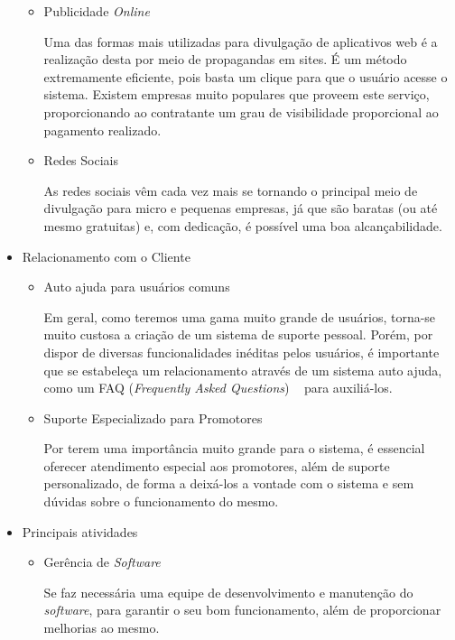 \begin{itemize}
\begin{itemize}
\item Publicidade \textit{Online}

Uma das formas mais utilizadas para divulgação de aplicativos web é a realização desta por meio de propagandas em sites. É um método extremamente eficiente, pois basta um clique para que o usuário acesse o sistema. Existem empresas muito populares que proveem este serviço, proporcionando ao contratante um grau de visibilidade proporcional ao pagamento realizado.

\item Redes Sociais

As redes sociais vêm cada vez mais se tornando o principal meio de divulgação para micro e pequenas empresas, já que são baratas (ou até mesmo gratuitas) e, com dedicação, é possível uma boa alcançabilidade. 

\end{itemize}

\item{Relacionamento com o Cliente}

\begin{itemize}
\item Auto ajuda para usuários comuns

Em geral, como teremos uma gama muito grande de usuários, torna-se muito custosa a criação de um sistema de suporte pessoal. Porém, por dispor de diversas funcionalidades inéditas pelos usuários, é importante que se estabeleça um relacionamento através de um sistema auto ajuda, como um FAQ (\textit{Frequently Asked Questions})
~
para auxiliá-los.

\item Suporte Especializado para Promotores

Por terem uma importância muito grande para o sistema, é essencial oferecer atendimento especial aos promotores, além de suporte personalizado, de forma a deixá-los a vontade com o sistema e sem dúvidas sobre o funcionamento do mesmo.

\end{itemize}

\item{Principais atividades}

\begin{itemize}
\item Gerência de \textit{Software}

Se faz necessária uma equipe de desenvolvimento e manutenção do \textit{software}, para garantir o seu bom funcionamento, além de proporcionar melhorias ao mesmo.


\end{itemize}
\end{itemize}

